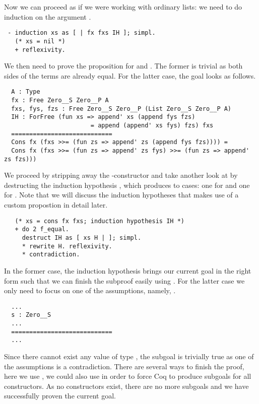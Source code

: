Now we can proceed as if we were working with ordinary lists: we need to do induction on the  argument .

\begin{verbatim}
 - induction xs as [ | fx fxs IH ]; simpl.
   (* xs = nil *)
   + reflexivity.
\end{verbatim}
 
We then need to prove the proposition for  and .
The former is trivial as both sides of the terms are already equal.
For the latter case, the goal looks as follows.

\begin{verbatim}
  A : Type
  fx : Free Zero__S Zero__P A
  fxs, fys, fzs : Free Zero__S Zero__P (List Zero__S Zero__P A)
  IH : ForFree (fun xs => append' xs (append fys fzs)
                        = append (append' xs fys) fzs) fxs
  ============================
  Cons fx (fxs >>= (fun zs => append' zs (append fys fzs)))) =
  Cons fx (fxs >>= (fun zs => append' zs fys) >>= (fun zs => append' zs fzs)))
\end{verbatim}

We proceed by stripping away the -constructor and take another look at  by destructing the induction hypothesis , which produces to cases: one for  and one for .
Note that we will discuss the induction hypotheses  that makes use of a custom propostion  in detail later.

\begin{verbatim}
   (* xs = cons fx fxs; induction hypothesis IH *)
   + do 2 f_equal.
     destruct IH as [ xs H | ]; simpl.
     * rewrite H. reflexivity.
     * contradiction.
\end{verbatim}

In the former case, the induction hypothesis brings our current goal in the right form such that we can finish the subproof easily using .
For the latter case we only need to focus on one of the assumptions, namely, .

\begin{verbatim}
  ...
  s : Zero__S
  ...
  ============================
  ...
\end{verbatim}

Since there cannot exist any value of type , the subgoal is trivially true as one of the assumptions is a contradiction.
There are several ways to finish the proof, here we use , we could also use  in order to force Coq to produce subgoals for all constructors.
As no constructors exist, there are no more subgoals and we have successfully proven the current goal.

